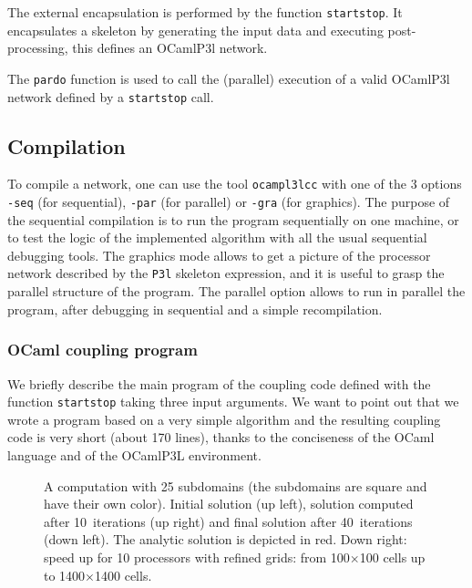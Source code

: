 \documentclass{article}
\begin{document}
The external encapsulation is performed by the function {\tt startstop}.
It encapsulates a skeleton by generating the input data and executing
post-processing, this defines an OCamlP3l network.

The {\tt pardo} function is used to call the (parallel) execution of a valid
OCamlP3l network defined by a {\tt startstop} call.

\subsection{Compilation}

To compile a network, one can use the tool {\tt ocampl3lcc} with one
of the 3 options {\tt -seq} (for sequential), {\tt -par} (for
parallel) or {\tt -gra} (for graphics). The purpose of the sequential
compilation is to run the program sequentially on one machine, or to
test the logic of the implemented algorithm with all the usual
sequential debugging tools. The graphics mode allows to get a picture
of the processor network described by the {\tt P3l} skeleton expression,
and it is useful to grasp the parallel structure of the program. The
parallel option allows to run in parallel the program, after debugging
in sequential and a simple recompilation.

\subsubsection*{OCaml coupling program}

We briefly describe the main program of the coupling code defined with the
function {\tt startstop} taking three input arguments. We want to point out
that we wrote a program based on a very simple algorithm and the resulting
coupling code is very short (about 170 lines), thanks to the conciseness of
the OCaml language and of the OCamlP3L environment.

\begin{figure}[htb]
  \begin{center} 
\end{center}
    \caption{A computation with 25 subdomains (the subdomains are
    square and have their own color). Initial solution (up left),
    solution computed after 10~iterations (up right) and final
    solution after 40~iterations (down left). The analytic solution is
    depicted in red.  Down right: speed up for 10 processors with
    refined grids: from 100$\times$100 cells up to 1400$\times$1400
    cells.}  \label{f:conv}
\end{figure}
\end{document}
